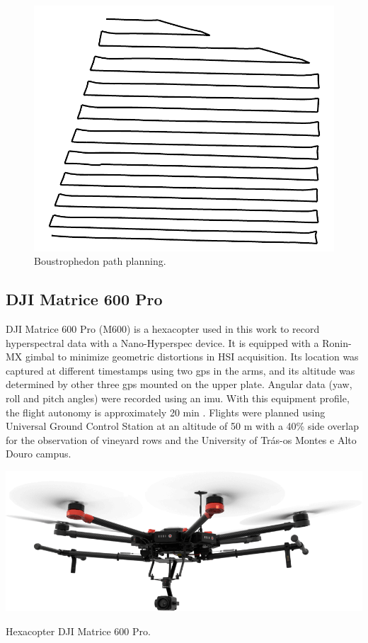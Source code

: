 \begin{figure}[ht]
	\includegraphics[width=.5\linewidth]{figs/materials/boustrophedon.png}
	\caption{Boustrophedon path planning.}
    \label{fig:boustrophedon}
\end{figure}

\subsection{DJI Matrice 600 Pro}

DJI Matrice 600 Pro (M600) is a hexacopter used in this work to record hyperspectral data with a Nano-Hyperspec device. It is equipped with a Ronin-MX gimbal to minimize geometric distortions in HSI acquisition. Its location was captured at different timestamps using two \acrshort{gps} in the arms, and its altitude was determined by other three \acrshort{gps} mounted on the upper plate. Angular data (yaw, roll and pitch angles) were recorded using an \acrshort{imu}. With this equipment profile, the flight autonomy is approximately 20 \si{\minute} \cite{sousa_uav-based_2022}. Flights were planned using Universal Ground Control Station at an altitude of 50 \si{\meter} with a 40\% side overlap for the observation of vineyard rows and the University of Trás-os Montes e Alto Douro campus.
\begin{marginfigure}[-2.0cm]
	\includegraphics{figs/materials/dji_matrice_600_pro.png}
	\caption{Hexacopter DJI Matrice 600 Pro.}
	\label{fig:dji_matrice_600_pro}
\end{marginfigure}

